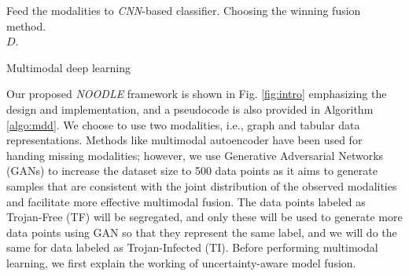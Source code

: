 \begin{algorithm}[!b]
\small
{}
Feed the modalities to \textit{CNN}-based classifier.
\newline 
{}
Choosing the winning fusion method.\\
\Return $D$.
\caption{Multimodal deep learning}
\label{algo:mdd}
\end{algorithm}

Our proposed \textit{NOODLE} framework is shown in Fig. \ref{fig:intro} emphasizing the design and implementation, and a pseudocode is also provided in Algorithm \ref{algo:mdd}. We choose to use two modalities, i.e., graph and tabular data representations. Methods like multimodal autoencoder \cite{jaques2017multimodal} have been used for handing missing modalities; however, we use Generative Adversarial Networks (GANs) \cite{creswell2018generative} to increase the dataset size to 500 data points as it aims to generate samples that are consistent with the joint distribution of the observed modalities and facilitate more effective multimodal fusion. The data points labeled as Trojan-Free (TF) will be segregated, and only these will be used to generate more data points using GAN so that they represent the same label, and we will do the same for data labeled as Trojan-Infected (TI). Before performing multimodal learning, we first explain the working of uncertainty-aware model fusion.

